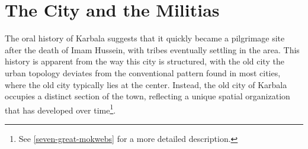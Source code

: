 



\section{The City and the Militias} \label{city-and-militias-section}
The oral history of Karbala suggests that it quickly became a pilgrimage site after the death of Imam Hussein, with tribes eventually settling in the area. This history is apparent from the way this city is structured, with the old city the urban topology deviates from the conventional pattern found in most cities, where the old city typically lies at the center. Instead, the old city of Karbala occupies a distinct section of the town, reflecting a unique spatial organization that has developed over time\footnote{See \ref{seven-great-mokwebs} for a more detailed description.}. 

